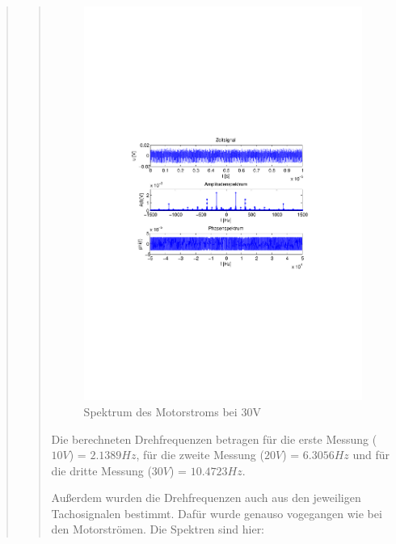 \begin{quote}
\begin{quote}
	           
	           \begin{figure}[H]
                    \centering
                        \includegraphics[scale=0.63, trim = 1cm 9cm 1.5cm 8cm,
                        clip]{./Bilder/Termin7/ampl_spektrum_messung3}
                        \caption{Spektrum des Motorstroms bei 30V}
               \end{figure}
	    
	    Die berechneten Drehfrequenzen betragen für die erste Messung ($10V$) =
	    $2.1389 Hz$, für die zweite Messung ($20V$) = $6.3056 Hz$ und für die
	    dritte Messung ($30V$) = $10.4723 Hz$.\\
	    
	    
	    Außerdem wurden die Drehfrequenzen auch aus den jeweiligen Tachosignalen
	    bestimmt. Dafür wurde genauso vogegangen wie bei den Motorströmen. Die
	    Spektren sind hier:
	       

\end{quote}
\end{quote}
